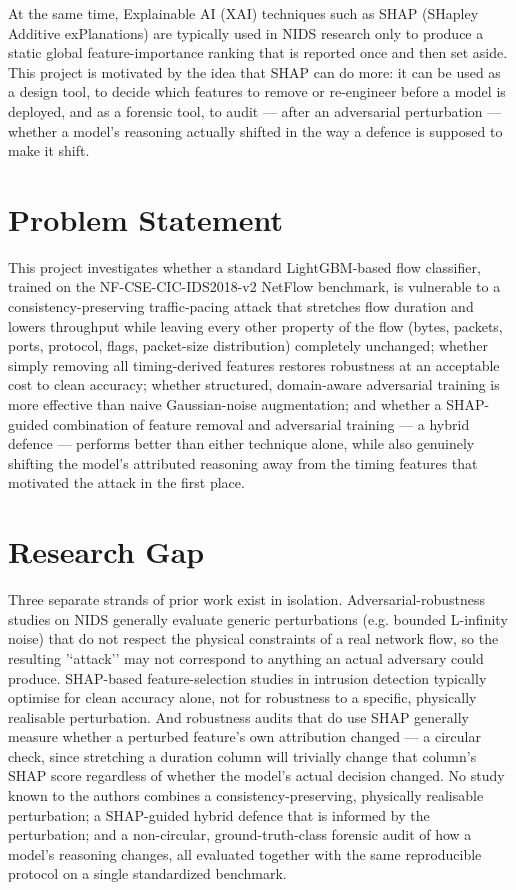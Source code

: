 \documentclass[12pt,a4paper]{report}
\begin{document}
At the same time, Explainable AI (XAI) techniques such as SHAP (SHapley Additive exPlanations) are typically used in NIDS research only to produce a static global feature-importance ranking that is reported once and then set aside. This project is motivated by the idea that SHAP can do more: it can be used as a design tool, to decide which features to remove or re-engineer before a model is deployed, and as a forensic tool, to audit --- after an adversarial perturbation --- whether a model's reasoning actually shifted in the way a defence is supposed to make it shift.

\section{Problem Statement}
This project investigates whether a standard LightGBM-based flow classifier, trained on the NF-CSE-CIC-IDS2018-v2 NetFlow benchmark, is vulnerable to a consistency-preserving traffic-pacing attack that stretches flow duration and lowers throughput while leaving every other property of the flow (bytes, packets, ports, protocol, flags, packet-size distribution) completely unchanged; whether simply removing all timing-derived features restores robustness at an acceptable cost to clean accuracy; whether structured, domain-aware adversarial training is more effective than naive Gaussian-noise augmentation; and whether a SHAP-guided combination of feature removal and adversarial training --- a hybrid defence --- performs better than either technique alone, while also genuinely shifting the model's attributed reasoning away from the timing features that motivated the attack in the first place.

\section{Research Gap}
Three separate strands of prior work exist in isolation. Adversarial-robustness studies on NIDS generally evaluate generic perturbations (e.g. bounded L-infinity noise) that do not respect the physical constraints of a real network flow, so the resulting '`attack'' may not correspond to anything an actual adversary could produce. SHAP-based feature-selection studies in intrusion detection typically optimise for clean accuracy alone, not for robustness to a specific, physically realisable perturbation. And robustness audits that do use SHAP generally measure whether a perturbed feature's own attribution changed --- a circular check, since stretching a duration column will trivially change that column's SHAP score regardless of whether the model's actual decision changed. No study known to the authors combines a consistency-preserving, physically realisable perturbation; a SHAP-guided hybrid defence that is informed by the perturbation; and a non-circular, ground-truth-class forensic audit of how a model's reasoning changes, all evaluated together with the same reproducible protocol on a single standardized benchmark.
\end{document}
